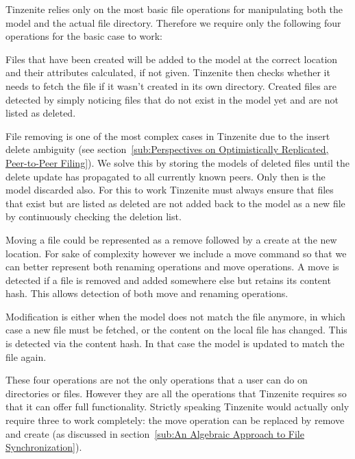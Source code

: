 Tinzenite relies only on the most basic file operations for manipulating both the model and the actual file directory.
Therefore we require only the following four operations for the basic case to work:

\begin{description}[leftmargin=5em,style=nextline,noitemsep,nolistsep]
    \item[Create]
        Files that have been created will be added to the model at the correct location and their attributes calculated, if not given.
        Tinzenite then checks whether it needs to fetch the file if it wasn't created in its own directory.
        Created files are detected by simply noticing files that do not exist in the model yet and are not listed as deleted.
    \item[Remove]
        File removing is one of the most complex cases in Tinzenite due to the insert delete ambiguity (see section~\ref{sub:Perspectives on Optimistically Replicated, Peer-to-Peer Filing}).
        We solve this by storing the models of deleted files until the delete update has propagated to all currently known peers.
        Only then is the model discarded also.
        For this to work Tinzenite must always ensure that files that exist but are listed as deleted are not added back to the model as a new file by continuously checking the deletion list.
    \item[Move]
        Moving a file could be represented as a remove followed by a create at the new location.
        For sake of complexity however we include a move command so that we can better represent both renaming operations and move operations.
        A move is detected if a file is removed and added somewhere else but retains its content hash.
        This allows detection of both move and renaming operations.
    \item[Modify]
        Modification is either when the model does not match the file anymore, in which case a new file must be fetched, or the content on the local file has changed.
        This is detected via the content hash.
        In that case the model is updated to match the file again.
\end{description}

These four operations are not the only operations that a user can do on directories or files.
However they are all the operations that Tinzenite requires so that it can offer full functionality.
Strictly speaking Tinzenite would actually only require three to work completely: the move operation can be replaced by remove and create (as discussed in section~\ref{sub:An Algebraic Approach to File Synchronization}).

